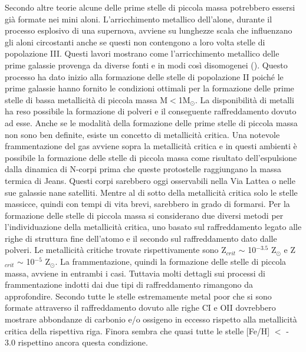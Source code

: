 \documentclass[12pt]{article}
\begin{document}
Secondo altre teorie alcune delle prime stelle di piccola massa potrebbero essersi già formate nei mini aloni. L’arricchimento metallico dell’alone, durante il processo esplosivo di una supernova, avviene su lunghezze scala che influenzano gli aloni circostanti anche se questi non contengono a loro volta stelle di popolazione III. Questi lavori mostrano come l’arricchimento metallico delle prime galassie provenga da diverse fonti e in modi così disomogenei (\cite{Wise}). Questo processo ha dato inizio alla formazione delle stelle di popolazione II poiché le prime galassie hanno fornito le condizioni ottimali per la formazione delle prime stelle di bassa metallicità di piccola massa M$<$1M$_{\odot}$.  La disponibilità di metalli ha reso possibile la formazione di polveri e il conseguente raffreddamento dovuto ad esse. Anche se le modalità della formazione delle prime stelle di piccola massa non sono ben definite, esiste un concetto di metallicità critica. Una notevole frammentazione del gas avviene sopra la metallicità critica e in questi ambienti è possibile la formazione delle stelle di piccola massa come risultato dell’espulsione dalla dinamica di N-corpi prima che queste protostelle raggiungano la massa termica di Jeans. Questi corpi sarebbero oggi osservabili nella Via Lattea o nelle sue galassie nane satelliti. Mentre al di sotto della metallicità critica solo le stelle massicce,  quindi con tempi di vita brevi, sarebbero in grado di formarsi.
Per la formazione delle stelle di piccola massa si considerano due diversi metodi per l’individuazione della metallicità critica, uno basato sul raffreddamento legato alle righe di struttura fine dell’atomo e il secondo sul raffreddamento dato dalle polveri. Le metallicità critiche trovate rispettivamente sono Z$_{crit}$ $\sim$ 10$^{-3.5}$ Z$_{\odot}$ e Z$_{crit}$ $\sim$ 10$^{-5}$ Z$_{\odot}$. La frammentazione, quindi la formazione delle stelle di piccola massa, avviene in entrambi i casi.
Tuttavia molti dettagli sui processi di frammentazione indotti dai due tipi di raffreddamento rimangono da approfondire. 
Secondo \cite{Frebel2007}  tutte le stelle estremamente metal poor che si sono formate attraverso il raffreddamento dovuto alle righe CI e OII dovrebbero mostrare abbondanze di carbonio e/o ossigeno in eccesso rispetto alla metallicità critica della rispettiva riga. Finora sembra che quasi tutte le stelle [Fe/H] $<$ - 3.0  rispettino ancora questa condizione. 
\end{document}
